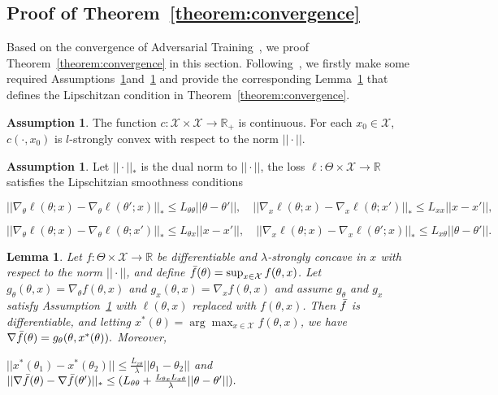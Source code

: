 \documentclass{article} %
\newcommand{\cX}{\mathcal{X}}
\theoremstyle{plain}
\newtheorem{lemma}[theorem]{Lemma}
\theoremstyle{definition}
\newtheorem{assumption}[theorem]{Assumption}
\theoremstyle{remark}
\begin{document}
\subsection{Proof of Theorem~\ref{theorem:convergence}}
\label{sec:app_comp_proof_section42}

Based on the convergence of Adversarial Training~\citep{sinha2018certifying}, we proof Theorem~\ref{theorem:convergence} in this section. Following~\citep{sinha2018certifying}, we firstly make some required Assumptions~\ref{app:assump_32_0}and~\ref{app:assump_32_1} and provide the corresponding Lemma~\ref{app:lemma_32_1} that defines the Lipschitzan condition in Theorem~\ref{theorem:convergence}.

\begin{assumption}
\label{app:assump_32_0}
The function $c: \cX\times\cX\rightarrow\mathbb{R}_{+}$ is continuous. For each $x_0\in\cX$, $c(\cdot, x_0)$ is $l$-strongly convex with respect to the norm $||\cdot||$.
\end{assumption}

\begin{assumption}
\label{app:assump_32_1}
Let $||\cdot||_{*}$ is the dual norm to $||\cdot||$, the loss $\ell:\Theta\times\cX\rightarrow\mathbb{R}$ satisfies the Lipschitzian smoothness conditions
\begin{center}
    $||\nabla_\theta \ell(\theta; x)-\nabla_\theta \ell(\theta'; x)||_{*}\leq L_{\theta\theta}||\theta - \theta'||,\quad ||\nabla_x \ell(\theta; x)-\nabla_x \ell(\theta; x')||_{*}\leq L_{xx}||x - x'||,$
\end{center}
\begin{center}
    $||\nabla_\theta \ell(\theta; x)-\nabla_\theta \ell(\theta; x')||_{*}\leq L_{\theta x}||x - x'||,\quad ||\nabla_x \ell(\theta; x)-\nabla_x \ell(\theta'; x)||_{*}\leq L_{x\theta}||\theta - \theta'||.$
\end{center}

\end{assumption}

\begin{lemma}
\label{app:lemma_32_1}
Let $f:\Theta\times\cX\rightarrow\mathbb{R}$ be differentiable and $\lambda$-strongly concave in $x$ with respect to the norm $||\cdot||$, and define $\Bar{f}(\theta)=\sup_{x\in\cX}f(\theta, x)$. Let $g_\theta(\theta,x) = \nabla_{\theta}f(\theta, x)$ and $g_x(\theta,x) = \nabla_{x}f(\theta, x)$ and assume $g_\theta$ and $g_x$ satisfy Assumption~\ref{app:assump_32_1} with $\ell(\theta, x)$ replaced with $f(\theta, x)$. Then $\Bar{f}$ is differentiable, and letting $x^*(\theta) = \arg\max_{x\in\cX}f(\theta, x)$, we have $\nabla\Bar{f}(\theta)=g_\theta(\theta, x^*(\theta)).$ Moreover,
\begin{center}
    $||x^*(\theta_1)-x^*(\theta_2)||\leq \frac{L_{x\theta}}{\lambda}||\theta_1-\theta_2||$ and $||\nabla\Bar{f}(\theta)-\nabla\Bar{f}(\theta')||_{*}\leq(L_{\theta\theta}+\frac{L_{\theta x}L_{x \theta}}{\lambda}||\theta-\theta'||).$
\end{center}

\end{lemma}
\end{document}
